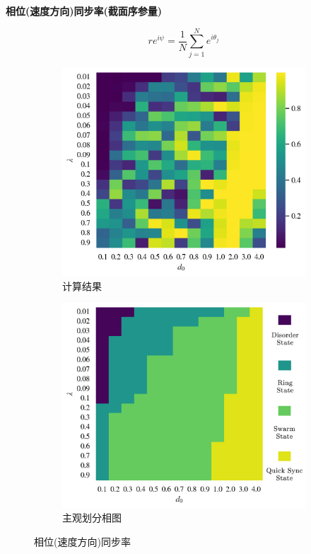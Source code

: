 \documentclass{article}
\begin{document}
\noindent\textbf{相位(速度方向)同步率(截面序参量)}

$$
r e^{i\psi}=\frac{1}{N}\sum_{j=1}^{N}{e^{i\theta _j}}
$$

\begin{figure}[H]
	\centering
	\begin{subfigure}[b]{0.49\textwidth}
		\includegraphics[width=\textwidth]{./figs/phaseSyncOp.png}
		\vspace{-1cm}
		\caption{计算结果}
	\end{subfigure}
	\begin{subfigure}[b]{0.49\textwidth}
		\includegraphics[width=\textwidth]{./figs/subjectiveOp.png}
		\vspace{-1cm}
		\caption{主观划分相图}
	\end{subfigure}
	\vspace{-0.5cm}
	\caption{相位(速度方向)同步率}
	\label{fig:fig234c.1}
\end{figure}
\end{document}
